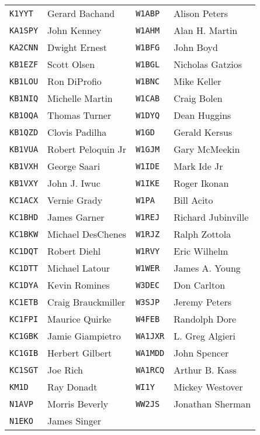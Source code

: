 \documentclass[10pt,letterpaper]{article}
\begin{document}
\begin{enumerate}
\begin{enumerate}
\begin{tabular}{|ll||ll|}
  \texttt{K1YYT}  & Gerard Bachand      & \texttt{W1ABP}  & Alison Peters       \\
  \texttt{KA1SPY} & John Kenney         & \texttt{W1AHM}  & Alan H. Martin      \\
  \texttt{KA2CNN} & Dwight Ernest       & \texttt{W1BFG}  & John Boyd           \\
  \texttt{KB1EZF} & Scott Olsen         & \texttt{W1BGL}  & Nicholas Gatzios    \\
  \texttt{KB1LOU} & Ron DiProfio        & \texttt{W1BNC}  & Mike Keller         \\
  \texttt{KB1NIQ} & Michelle Martin     & \texttt{W1CAB}  & Craig Bolen         \\
  \texttt{KB1OQA} & Thomas Turner       & \texttt{W1DYQ}  & Dean  Huggins       \\
  \texttt{KB1QZD} & Clovis Padilha      & \texttt{W1GD}   & Gerald  Kersus      \\
  \texttt{KB1VUA} & Robert Peloquin Jr  & \texttt{W1GJM}  & Gary McMeekin       \\
  \texttt{KB1VXH} & George Saari        & \texttt{W1IDE}  & Mark Ide Jr         \\
  \texttt{KB1VXY} & John J. Iwuc        & \texttt{W1IKE}  & Roger Ikonan        \\
  \texttt{KC1ACX} & Vernie Grady        & \texttt{W1PA}   & Bill Acito          \\
  \texttt{KC1BHD} & James Garner        & \texttt{W1REJ}  & Richard Jubinville  \\
  \texttt{KC1BKW} & Michael DesChenes   & \texttt{W1RJZ}  & Ralph Zottola       \\
  \texttt{KC1DQT} & Robert Diehl        & \texttt{W1RVY}  & Eric  Wilhelm       \\
  \texttt{KC1DTT} & Michael Latour      & \texttt{W1WER}  & James A. Young      \\
  \texttt{KC1DYA} & Kevin Romines       & \texttt{W3DEC}  & Don Carlton         \\
  \texttt{KC1ETB} & Craig Brauckmiller  & \texttt{W3SJP}  & Jeremy Peters       \\
  \texttt{KC1FPI} & Maurice Quirke      & \texttt{W4FEB}  & Randolph Dore       \\
  \texttt{KC1GBK} & Jamie Giampietro    & \texttt{WA1JXR} & L. Greg Algieri     \\
  \texttt{KC1GIB} & Herbert Gilbert     & \texttt{WA1MDD} & John Spencer        \\
  \texttt{KC1SGT} & Joe Rich            & \texttt{WA1RCQ} & Arthur B. Kass      \\
  \texttt{KM1D}   & Ray Donadt          & \texttt{WI1Y}   & Mickey Westover     \\
  \texttt{N1AVP}  & Morris Beverly      & \texttt{WW2JS}  & Jonathan Sherman    \\
  \texttt{N1EKO}  & James Singer        &                 &                     \\
  \hline
  \end{tabular}


\end{enumerate}
\end{enumerate}
\end{document}
